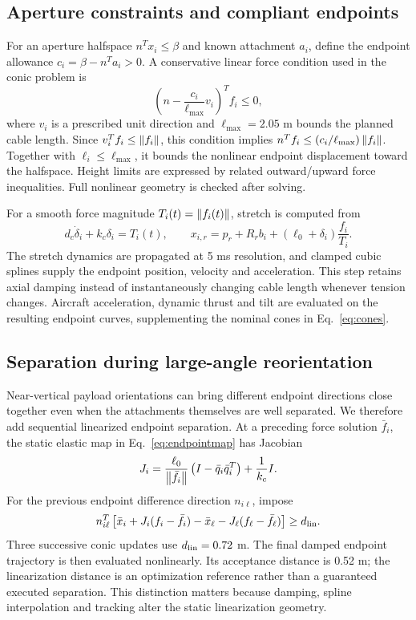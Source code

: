 \subsection{Aperture constraints and compliant endpoints}
For an aperture halfspace $n^Tx_i\leq\beta$ and known attachment $a_i$, define the endpoint allowance $c_i=\beta-n^Ta_i>0$. A conservative linear force condition used in the conic problem is
\begin{equation}
 \left(n-\frac{c_i}{\ell_{\max}}v_i\right)^Tf_i\leq0,
 \label{eq:halfspace}
\end{equation}
where $v_i$ is a prescribed unit direction and $\ell_{\max}=2.05$ m bounds the planned cable length. Since $v_i^Tf_i\leq\left\lVert f_i\right\rVert$, this condition implies $n^Tf_i\leq(c_i/\ell_{\max})\left\lVert f_i\right\rVert$. Together with $\ell_i\leq\ell_{\max}$, it bounds the nonlinear endpoint displacement toward the halfspace. Height limits are expressed by related outward/upward force inequalities. Full nonlinear geometry is checked after solving.

For a smooth force magnitude $T_i(t)=\left\lVert f_i(t)\right\rVert$, stretch is computed from
\begin{equation}
 d_c\dot\delta_i+k_c\delta_i=T_i(t),\qquad
 x_{i,r}=p_r+R_rb_i+(\ell_0+\delta_i)\frac{f_i}{T_i}.
 \label{eq:stretch}
\end{equation}
The stretch dynamics are propagated at 5 ms resolution, and clamped cubic splines supply the endpoint position, velocity and acceleration. This step retains axial damping instead of instantaneously changing cable length whenever tension changes. Aircraft acceleration, dynamic thrust and tilt are evaluated on the resulting endpoint curves, supplementing the nominal cones in Eq.~\eqref{eq:cones}.

\subsection{Separation during large-angle reorientation}
Near-vertical payload orientations can bring different endpoint directions close together even when the attachments themselves are well separated. We therefore add sequential linearized endpoint separation. At a preceding force solution $\bar f_i$, the static elastic map in Eq.~\eqref{eq:endpointmap} has Jacobian
\begin{equation}
 J_i=\frac{\ell_0}{\left\lVert\bar f_i\right\rVert}\left(I-\bar q_i\bar q_i^T\right)+\frac{1}{k_c}I.
 \label{eq:jacobian}
\end{equation}
For the previous endpoint difference direction $n_{i\ell}$, impose
\begin{equation}
 n_{i\ell}^{T}\left[\bar x_i+J_i(f_i-\bar f_i)
 -\bar x_\ell-J_\ell(f_\ell-\bar f_\ell)\right]\geq d_{\rm lin}.
 \label{eq:separation}
\end{equation}
Three successive conic updates use $d_{\rm lin}=0.72$ m. The final damped endpoint trajectory is then evaluated nonlinearly. Its acceptance distance is 0.52 m; the linearization distance is an optimization reference rather than a guaranteed executed separation. This distinction matters because damping, spline interpolation and tracking alter the static linearization geometry.

